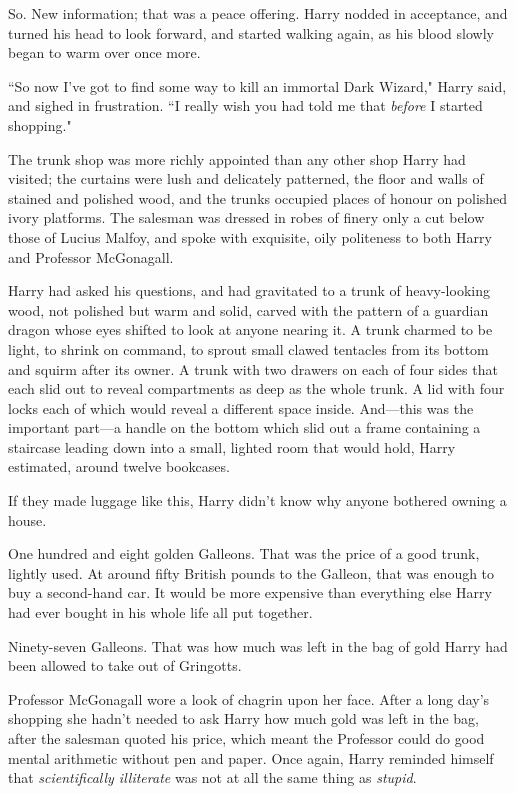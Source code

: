 So. New information; that was a peace offering. Harry nodded in acceptance, and turned his head to look forward, and started walking again, as his blood slowly began to warm over once more.

``So now I've got to find some way to kill an immortal Dark Wizard," Harry said, and sighed in frustration. ``I really wish you had told me that \emph{before} I started shopping."

\later

The trunk shop was more richly appointed than any other shop Harry had visited; the curtains were lush and delicately patterned, the floor and walls of stained and polished wood, and the trunks occupied places of honour on polished ivory platforms. The salesman was dressed in robes of finery only a cut below those of Lucius Malfoy, and spoke with exquisite, oily politeness to both Harry and Professor McGonagall.

Harry had asked his questions, and had gravitated to a trunk of heavy-looking wood, not polished but warm and solid, carved with the pattern of a guardian dragon whose eyes shifted to look at anyone nearing it. A trunk charmed to be light, to shrink on command, to sprout small clawed tentacles from its bottom and squirm after its owner. A trunk with two drawers on each of four sides that each slid out to reveal compartments as deep as the whole trunk. A lid with four locks each of which would reveal a different space inside. And—this was the important part—a handle on the bottom which slid out a frame containing a staircase leading down into a small, lighted room that would hold, Harry estimated, around twelve bookcases.

If they made luggage like this, Harry didn't know why anyone bothered owning a house.

One hundred and eight golden Galleons. That was the price of a good trunk, lightly used. At around fifty British pounds to the Galleon, that was enough to buy a second-hand car. It would be more expensive than everything else Harry had ever bought in his whole life all put together.

Ninety-seven Galleons. That was how much was left in the bag of gold Harry had been allowed to take out of Gringotts.

Professor McGonagall wore a look of chagrin upon her face. After a long day's shopping she hadn't needed to ask Harry how much gold was left in the bag, after the salesman quoted his price, which meant the Professor could do good mental arithmetic without pen and paper. Once again, Harry reminded himself that \emph{scientifically illiterate} was not at all the same thing as \emph{stupid}.

